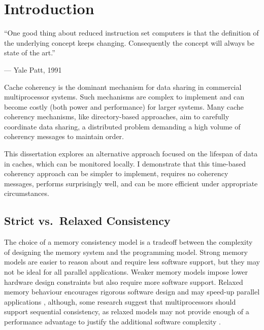 \makeatletter
\newcommand{\rmnum}[1]{\romannumeral #1 }
\newcommand{\Rmnum}[1]{\expandafter\@slowromancap\romannumeral #1@}
\makeatother
\ifpdf
\graphicspath{{Introducation/IntroducationFigs/PNG/}{Introducation/IntroducationFigs/PDF/}{Introducation/IntroducationFigs/}}
\else
\graphicspath{{Introducation/IntroducationFigs/EPS/}{Introducation/IntroducationFigs/}}
\fi

\makeatletter
{}
\makeatother

\chapter{Introduction}
	\vspace{2mm}

	\renewcommand{\textflush}{flushepinormal}
	\epigraph{``One good thing about reduced instruction set computers is that the definition of the underlying concept keeps changing.  Consequently the concept will always be state of the art.''}{--- \textup{Yale Patt}, 1991}

	\vspace{10mm}

	\noindent
	Cache coherency is the dominant mechanism for data sharing in commercial multiprocessor systems. Such mechanisms are complex to implement and can become costly (both power and performance) for larger systems.
	Many cache coherency mechanisms, like directory-based approaches, aim to carefully coordinate data sharing, a distributed problem demanding a high volume of coherency messages to maintain order.
	
	This dissertation explores an alternative approach focused on the lifespan of data in caches, which can be monitored locally. 
	I demonstrate that this time-based coherency approach can be simpler to implement, requires no coherency messages, performs surprisingly well, and can be more efficient under appropriate circumstances.

	\section{Strict vs.\ Relaxed Consistency}
		The choice of a memory consistency model is a tradeoff between the complexity of designing the memory system and the programming model. Strong memory models are easier to reason about and require less software support, but they may not be ideal for all parallel applications. 
		Weaker memory models impose lower hardware design constraints but also require more software support. Relaxed memory behaviour encourages rigorous software design and may speed-up parallel applications \cite{Mosberger93},
		although, some research suggest that multiprocessors should support sequential consistency, as relaxed models may not provide enough of a performance advantage to justify the additional software complexity \cite{Hill98}.
		
